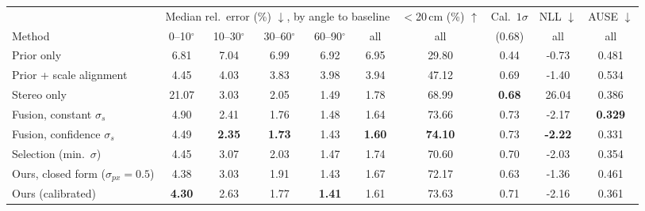 \begin{tabular}{l ccccc c ccc}
\toprule
 & \multicolumn{5}{c}{Median rel.\ error (\%) $\downarrow$, by angle to baseline} & $<$20\,cm (\%) $\uparrow$ & Cal.\ $1\sigma$ & NLL $\downarrow$ & AUSE $\downarrow$ \\
\cmidrule(lr){2-6}
Method & 0--10$^\circ$ & 10--30$^\circ$ & 30--60$^\circ$ & 60--90$^\circ$ & all & all & (0.68) & all & all \\
\midrule
Prior only & 6.81 & 7.04 & 6.99 & 6.92 & 6.95 & 29.80 & 0.44 & -0.73 & 0.481 \\
Prior + scale alignment & 4.45 & 4.03 & 3.83 & 3.98 & 3.94 & 47.12 & 0.69 & -1.40 & 0.534 \\
Stereo only & 21.07 & 3.03 & 2.05 & 1.49 & 1.78 & 68.99 & \textbf{0.68} & 26.04 & 0.386 \\
\midrule
Fusion, constant $\sigma_s$ & 4.90 & 2.41 & 1.76 & 1.48 & 1.64 & 73.66 & 0.73 & -2.17 & \textbf{0.329} \\
Fusion, confidence $\sigma_s$ & 4.49 & \textbf{2.35} & \textbf{1.73} & 1.43 & \textbf{1.60} & \textbf{74.10} & 0.73 & \textbf{-2.22} & 0.331 \\
Selection (min.\ $\sigma$) & 4.45 & 3.07 & 2.03 & 1.47 & 1.74 & 70.60 & 0.70 & -2.03 & 0.354 \\
Ours, closed form ($\sigma_{px}{=}0.5$) & 4.38 & 3.03 & 1.91 & 1.43 & 1.67 & 72.17 & 0.63 & -1.36 & 0.461 \\
Ours (calibrated) & \textbf{4.30} & 2.63 & 1.77 & \textbf{1.41} & 1.61 & 73.63 & 0.71 & -2.16 & 0.361 \\
\bottomrule
\end{tabular}
